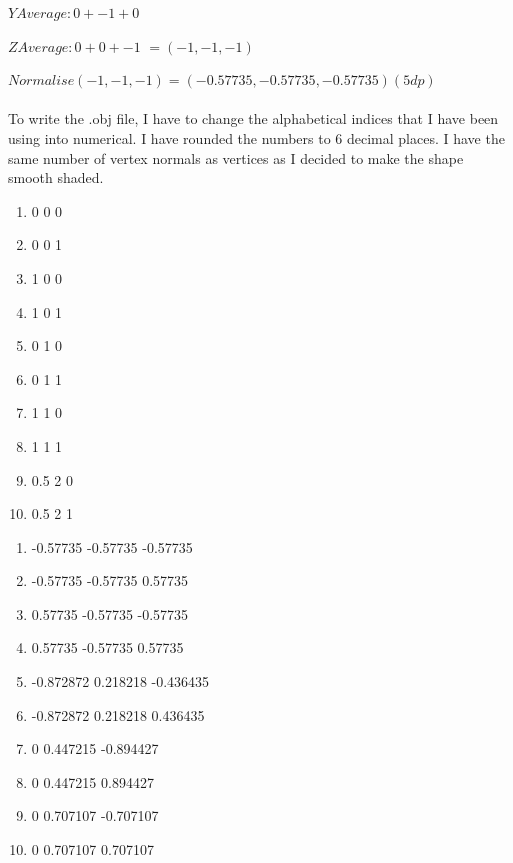 \documentclass[10pt]{report}
\begin{document}
\(Y Average: 0 + -1 + 0\)

\(Z Average: 0 + 0 + -1\)
\( = (-1,-1,-1)\)

\(Normalise  (-1,-1,-1) = 
(-0.57735, -0.57735, -0.57735) (5dp)\)
\\\\
To write the .obj file, I have to change the alphabetical indices that I have been using into numerical. I have rounded the numbers to 6 decimal places. I have the same number of vertex normals as vertices as I decided to make the shape smooth shaded. 

\begin{enumerate}[v]
    \item 0 0 0 %
    \item 0 0 1 %
    \item 1 0 0 %
    \item 1 0 1 %
    \item 0 1 0 %
    \item 0 1 1 %
    \item 1 1 0 %
    \item 1 1 1 %
    \item 0.5 2 0 %
    \item 0.5 2 1 %
\end{enumerate}     

\begin{enumerate}[vn]
    \item -0.57735 -0.57735 -0.57735 %
    \item -0.57735 -0.57735 0.57735 %
    \item 0.57735 -0.57735 -0.57735 %
    \item 0.57735 -0.57735 0.57735 %
    \item -0.872872 0.218218 -0.436435 %
    \item -0.872872 0.218218 0.436435 %
    \item 0 0.447215 -0.894427 %
    \item 0 0.447215 0.894427 %
    \item 0 0.707107 -0.707107 %
    \item 0 0.707107 0.707107 %
\end{enumerate}  
\end{document}
